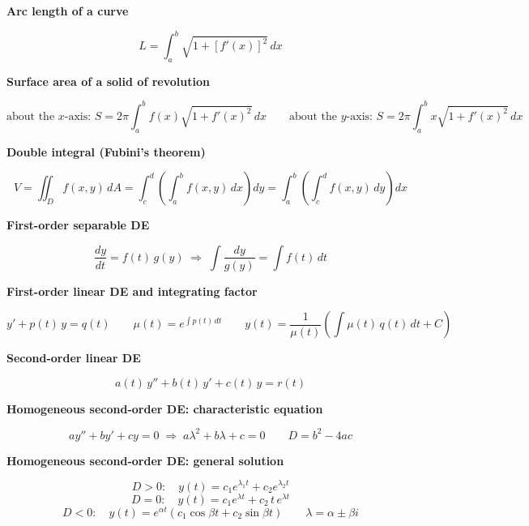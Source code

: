 \documentclass[11pt]{article}
\newcommand{\sub}[1]{\par\medskip\textbf{#1}\par}
\begin{document}
\sub{Arc length of a curve}
\[ L = \int_a^b \sqrt{1 + \left[f'(x)\right]^2}\,dx \]

\sub{Surface area of a solid of revolution}
\[ \text{about the } x\text{-axis: } S = 2\pi\int_a^b f(x)\sqrt{1 + f'(x)^2}\,dx \qquad \text{about the } y\text{-axis: } S = 2\pi\int_a^b x\sqrt{1 + f'(x)^2}\,dx \]

\sub{Double integral (Fubini's theorem)}
\[ V = \iint_D f(x, y)\,dA = \int_c^d \left(\int_a^b f(x, y)\,dx\right)dy = \int_a^b \left(\int_c^d f(x, y)\,dy\right)dx \]

\sub{First-order separable DE}
\[ \frac{dy}{dt} = f(t)\,g(y) \;\Rightarrow\; \int \frac{dy}{g(y)} = \int f(t)\,dt \]

\sub{First-order linear DE and integrating factor}
\[ y' + p(t)\,y = q(t) \qquad \mu(t) = e^{\int p(t)\,dt} \qquad y(t) = \frac{1}{\mu(t)}\left(\int \mu(t)\,q(t)\,dt + C\right) \]

\sub{Second-order linear DE}
\[ a(t)\,y'' + b(t)\,y' + c(t)\,y = r(t) \]

\sub{Homogeneous second-order DE: characteristic equation}
\[ ay'' + by' + cy = 0 \;\Rightarrow\; a\lambda^2 + b\lambda + c = 0 \qquad D = b^2 - 4ac \]

\sub{Homogeneous second-order DE: general solution}
\[ D > 0: \quad y(t) = c_1 e^{\lambda_1 t} + c_2 e^{\lambda_2 t} \]
\[ D = 0: \quad y(t) = c_1 e^{\lambda t} + c_2\,t\,e^{\lambda t} \]
\[ D < 0: \quad y(t) = e^{\alpha t}\left(c_1\cos\beta t + c_2\sin\beta t\right) \qquad \lambda = \alpha \pm \beta i \]
\end{document}
